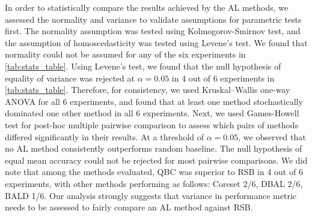 \documentclass[10pt,twocolumn,letterpaper]{article}
\begin{document}
In order to statistically compare the results achieved by the AL methods, we assessed the normality and variance to validate assumptions for parametric tests first. The normality assumption was tested using Kolmogorov-Smirnov test, and the assumption of homoscedasticity was tested using Levene's test. We found that normality could not be assumed for any of the six experiments in \cref{tab:stats_table}.
Using Levene's test, we found that the null hypothesis of equality of variance was rejected at $\alpha=0.05$ in 4 out of 6 experiments in \cref{tab:stats_table}. Therefore, for consistency, we used Kruskal–Wallis one-way ANOVA for all 6 experiments, and found that at least one method stochastically dominated one other method in all 6 experiments. Next, we used Games-Howell test for post-hoc multiple pairwise comparison to assess which pairs of methods differed significantly in their results. At a threshold of $\alpha=0.05$, we observed that no AL method consistently outperforms random baseline. The null hypothesis of equal mean accuracy could not be rejected for most pairwise comparisons. We did note that among the methods evaluated, QBC was superior to RSB in 4 out of 6 experiments, with other methods performing as follows: Coreset 2/6, DBAL 2/6, BALD 1/6. Our analysis strongly suggests that variance in performance metric needs to be assessed to fairly compare an AL method against RSB.
\end{document}
